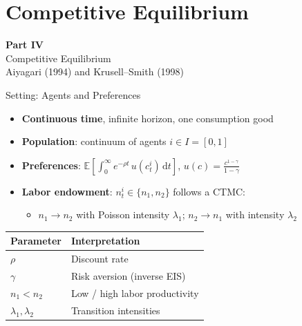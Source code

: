 \documentclass[aspectratio=169,11pt]{beamer}
\newcommand{\E}[1]{\mathbb{E}\!\left[#1\right]}
\newcommand{\ud}{\,\mathrm{d}}
\begin{document}
\section{Competitive Equilibrium}

\begin{frame}{}
\vfill
\begin{center}
{\Huge \textcolor{uzhblue}{\textbf{Part IV}}}\\[12pt]
{\LARGE Competitive Equilibrium}\\[6pt]
{\large Aiyagari (1994) and Krusell--Smith (1998)}
\end{center}
\vfill
\end{frame}

\begin{frame}{Setting: Agents and Preferences}
\small
\begin{itemize}\itemsep1pt
    \item \textbf{Continuous time}, infinite horizon, one consumption good
    \item \textbf{Population}: continuum of agents $i \in I = [0,1]$
    \item \textbf{Preferences}: $\E{\int_0^\infty e^{-\rho t}\,u(c_t^i)\ud t}$, \; $u(c) = \frac{c^{1-\gamma}}{1-\gamma}$
    \item \textbf{Labor endowment}: $n_t^i \in \{n_1, n_2\}$ follows a CTMC:
    \begin{itemize}\itemsep0pt
        \item $n_1 \to n_2$ with Poisson intensity $\lambda_1$; \; $n_2 \to n_1$ with intensity $\lambda_2$
    \end{itemize}
\end{itemize}

\vspace{0.1em}
\begin{center}
\renewcommand{\arraystretch}{1.0}
\begin{tabular}{ll}
\toprule
\textbf{Parameter} & \textbf{Interpretation} \\
\midrule
$\rho$ & Discount rate \\
$\gamma$ & Risk aversion (inverse EIS) \\
$n_1 < n_2$ & Low / high labor productivity \\
$\lambda_1, \lambda_2$ & Transition intensities \\
\bottomrule
\end{tabular}
\end{center}
\end{frame}
\end{document}
